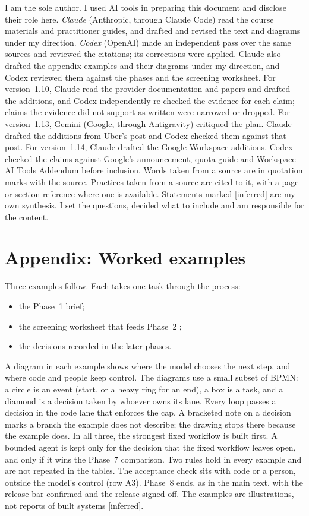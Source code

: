\documentclass[10pt]{article}
\newcommand{\inferred}{\textsf{\small[inferred]}}
\begin{document}
I am the sole author. I used AI tools in preparing this document and disclose their role here.
\emph{Claude} (Anthropic, through Claude Code) read the course materials and practitioner guides, and drafted and revised the text and diagrams under my direction.
\emph{Codex} (OpenAI) made an independent pass over the same sources and reviewed the citations; its corrections were applied.
Claude also drafted the appendix examples and their diagrams under my direction, and Codex reviewed them against the phases and the screening worksheet.
For version~1.10, Claude read the provider documentation and papers and drafted the additions, and Codex independently re-checked the evidence for each claim; claims the evidence did not support as written were narrowed or dropped.
For version~1.13, Gemini (Google, through Antigravity) critiqued the plan. Claude drafted the additions from Uber's post and Codex checked them against that post. For version~1.14, Claude drafted the Google Workspace additions. Codex checked the claims against Google's announcement, quota guide and Workspace AI Tools Addendum before inclusion.
Words taken from a source are in quotation marks with the source. Practices taken from a source are cited to it, with a page or section reference where one is available. Statements marked \inferred{} are my own synthesis.
I set the questions, decided what to include and am responsible for the content.

\section*{Appendix: Worked examples}\label{app:examples}

Three examples follow. Each takes one task through the process:
\begin{itemize}
\item the Phase~1 brief;
\item the screening worksheet that feeds Phase~2 \cite[Section~6]{screen};
\item the decisions recorded in the later phases.
\end{itemize}
A diagram in each example shows where the model chooses the next step, and where code and people keep control.
The diagrams use a small subset of BPMN: a circle is an event (start, or a heavy ring for an end), a box is a task, and a diamond is a decision taken by whoever owns its lane. Every loop passes a decision in the code lane that enforces the cap. A bracketed note on a decision marks a branch the example does not describe; the drawing stops there because the example does.
In all three, the strongest fixed workflow is built first. A bounded agent is kept only for the decision that the fixed workflow leaves open, and only if it wins the Phase~7 comparison.
Two rules hold in every example and are not repeated in the tables. The acceptance check sits with code or a person, outside the model's control (row A3). Phase~8 ends, as in the main text, with the release bar confirmed and the release signed off.
The examples are illustrations, not reports of built systems \inferred.
\end{document}
